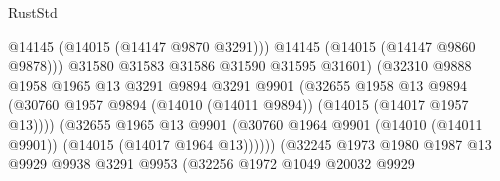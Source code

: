 \begin{lexlean}{RustStd}
\begin{coremodule}
                                              @14145
                                              (@14015 (@14147 @9870 @3291)))
                                            @14145
                                            (@14015 (@14147 @9860 @9878)))
                                          @31580
                                          @31583
                                          @31586
                                          @31590
                                          @31595
                                          @31601)
                                        (@32310
                                          @9888
                                          @1958
                                          @1965
                                          @13
                                          @3291
                                          @9894
                                          @3291
                                          @9901
                                          (@32655
                                            @1958
                                            @13
                                            @9894
                                            (@30760
                                              @1957
                                              @9894
                                              (@14010 (@14011 @9894))
                                              (@14015 (@14017 @1957 @13))))
                                          (@32655
                                            @1965
                                            @13
                                            @9901
                                            (@30760
                                              @1964
                                              @9901
                                              (@14010 (@14011 @9901))
                                              (@14015 (@14017 @1964 @13))))))
                                      (@32245
                                        @1973
                                        @1980
                                        @1987
                                        @13
                                        @9929
                                        @9938
                                        @3291
                                        @9953
                                        (@32256
                                          @1972
                                          @1049
                                          @20032
                                          @9929

\end{coremodule}
\end{lexlean}
